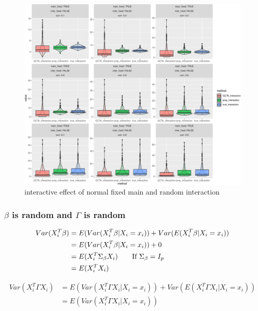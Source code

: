 \documentclass[]{article}
\begin{document}
\begin{figure}
\centering
\includegraphics{Simulation_report_files/figure-latex/inter_fixed_random_normal-1.pdf}
\caption{interactive effect of normal fixed main and random interaction}
\end{figure}

\clearpage

\subsubsection{\texorpdfstring{\(\beta\) is random and \(\Gamma\) is
random}{\textbackslash{}beta is random and \textbackslash{}Gamma is random}}\label{beta-is-random-and-gamma-is-random}

\begin{align*}
    Var(X_i^T\beta) &= E(Var(X_i^T\beta|X_i = x_i)) + Var(E(X_i^T\beta|X_i = x_i))\\
                    &= E(Var(X_i^T\beta|X_i = x_i)) + 0 \\
                    &= E(X_i^T \Sigma_{\beta} X_i)  \tag*{If $\Sigma_{\beta} = I_p$}\\
                    &= E(X_i^TX_i)
\end{align*}

\begin{align*}
    Var(X_i^T\Gamma X_i) &= E(Var(X_i^T\Gamma X_i|X_i = x_i)) + Var(E(X_i^T\Gamma X_i|X_i = x_i)) \\ 
                         &= E(Var(X_i^T\Gamma X_i|X_i = x_i))
\end{align*}
\end{document}
